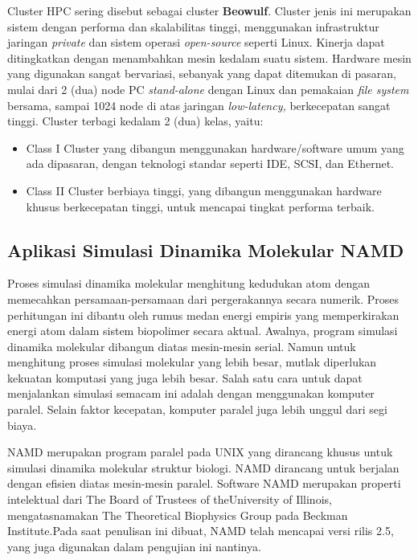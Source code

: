\documentclass[aps,showpacs,pre,floatfix]{revtex4}
\begin{document}
Cluster HPC sering disebut sebagai cluster \textbf{Beowulf}.
Cluster jenis ini merupakan sistem dengan performa dan
skalabilitas tinggi, menggunakan infrastruktur jaringan
\textit{private} dan sistem operasi \textit{open-source} seperti
Linux. Kinerja dapat ditingkatkan dengan menambahkan mesin kedalam
suatu sistem. Hardware mesin yang digunakan sangat bervariasi,
sebanyak yang dapat ditemukan di pasaran, mulai dari 2 (dua) node
PC \textit{stand-alone} dengan Linux dan pemakaian \textit{file
system} bersama, sampai 1024 node di atas jaringan
\textit{low-latency,} berkecepatan sangat tinggi. Cluster terbagi
kedalam 2 (dua) kelas, yaitu:

\begin{itemize}
    \item {\footnotesize Class I Cluster yang dibangun menggunakan
hardware/software umum yang ada dipasaran, dengan  teknologi standar
seperti IDE, SCSI, dan Ethernet.}
    \item {\footnotesize Class II  Cluster berbiaya tinggi, yang dibangun
menggunakan hardware khusus berkecepatan tinggi, untuk mencapai tingkat
performa terbaik.}
\end{itemize}


\subsection{Aplikasi Simulasi Dinamika Molekular NAMD}

Proses simulasi dinamika molekular menghitung kedudukan atom
dengan memecahkan persamaan-persamaan dari pergerakannya secara
numerik. Proses perhitungan ini dibantu oleh rumus medan energi
empiris yang memperkirakan energi atom dalam sistem biopolimer
secara aktual. Awalnya, program simulasi dinamika molekular
dibangun diatas mesin-mesin serial. Namun untuk menghitung proses
simulasi molekular yang lebih besar, mutlak diperlukan kekuatan
komputasi yang juga lebih besar. Salah satu cara untuk dapat
menjalankan simulasi semacam ini adalah dengan menggunakan
komputer paralel. Selain faktor kecepatan, komputer paralel juga
lebih unggul dari segi biaya.

NAMD merupakan program paralel pada UNIX yang dirancang khusus
untuk simulasi  dinamika molekular struktur biologi. NAMD
dirancang untuk berjalan dengan efisien diatas mesin-mesin
paralel. Software NAMD merupakan properti intelektual dari The
Board of Trustees of theUniversity of Illinois, mengatasnamakan
The Theoretical Biophysics Group pada Beckman Institute.Pada saat
penulisan ini dibuat, NAMD telah mencapai versi rilis 2.5, yang
juga digunakan dalam pengujian ini nantinya.
\end{document}
